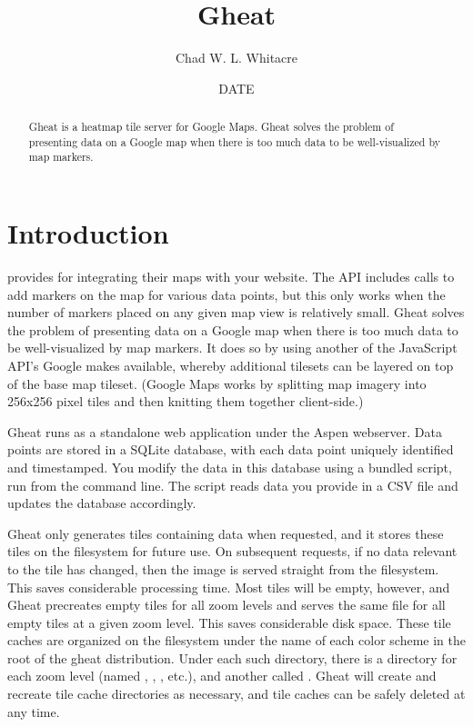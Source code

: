 \documentclass{manual}
\title{Gheat}
\author{Chad W. L. Whitacre}
\date{~~DATE~~} %
\begin{document}
\maketitle

\begin{abstract}

\noindent

Gheat is a heatmap tile server for Google Maps. Gheat solves the problem of
presenting data on a Google map when there is too much data to be
well-visualized by map markers.

\end{abstract}


\chapter{Introduction}
\label{introduction}

 provides  for integrating their maps with your
website. The API includes calls to add markers on the map for various data
points, but this only works when the number of markers placed on any given map
view is relatively small. Gheat solves the problem of presenting data on a
Google map when there is too much data to be well-visualized by map markers. It
does so by using another of the JavaScript API's Google makes available,
whereby additional tilesets can be layered on top of the base map tileset.
(Google Maps works by splitting map imagery into 256x256 pixel tiles and then
knitting them together client-side.)

Gheat runs as a standalone web application under the Aspen webserver. Data 
points are stored in a SQLite database, with each data point uniquely identified
and timestamped. You modify the data in this database using a bundled script, 
run from the command line. The script reads data you provide in a CSV file and 
updates the database accordingly.

Gheat only generates tiles containing data when requested, and it stores these
tiles on the filesystem for future use. On subsequent requests, if no data
relevant to the tile has changed, then the image is served straight from the
filesystem. This saves considerable processing time. Most tiles will be empty,
however, and Gheat precreates empty tiles for all zoom levels and serves the
same file for all empty tiles at a given zoom level. This saves considerable
disk space. These tile caches are organized on the filesystem under the name of
each color scheme in the root of the gheat distribution. Under each such
directory, there is a directory for each zoom level (named , ,
, etc.), and another called . Gheat will create and
recreate tile cache directories as necessary, and tile caches can be safely
deleted at any time.
\end{document}
